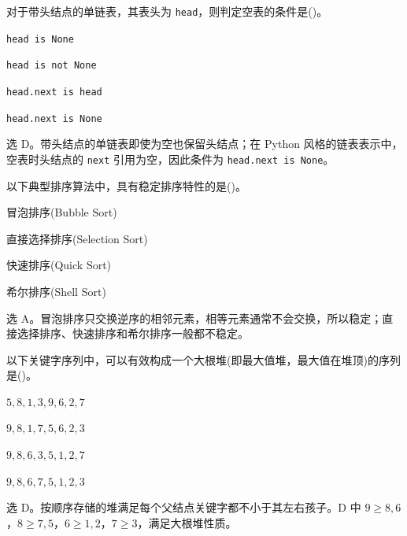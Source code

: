 \begin{question}
对于带头结点的单链表，其表头为 \texttt{head}，则判定空表的条件是(\quad)。
\begin{choiceoptions}[2]
  \item \texttt{head is None}
  \item \texttt{head is not None}
  \item \texttt{head.next is head}
  \item \texttt{head.next is None}
\end{choiceoptions}
\begin{solution}
选 D。带头结点的单链表即使为空也保留头结点；在 Python 风格的链表表示中，空表时头结点的 \texttt{next} 引用为空，因此条件为 \texttt{head.next is None}。
\end{solution}
\end{question}

\begin{question}
以下典型排序算法中，具有稳定排序特性的是(\quad)。
\begin{choiceoptions}[1]
  \item 冒泡排序(Bubble Sort)
  \item 直接选择排序(Selection Sort)
  \item 快速排序(Quick Sort)
  \item 希尔排序(Shell Sort)
\end{choiceoptions}
\begin{solution}
选 A。冒泡排序只交换逆序的相邻元素，相等元素通常不会交换，所以稳定；直接选择排序、快速排序和希尔排序一般都不稳定。
\end{solution}
\end{question}

\begin{question}
以下关键字序列中，可以有效构成一个大根堆(即最大值堆，最大值在堆顶)的序列是(\quad)。
\begin{choiceoptions}[1]
  \item $5,8,1,3,9,6,2,7$
  \item $9,8,1,7,5,6,2,3$
  \item $9,8,6,3,5,1,2,7$
  \item $9,8,6,7,5,1,2,3$
\end{choiceoptions}
\begin{solution}
选 D。按顺序存储的堆满足每个父结点关键字都不小于其左右孩子。D 中 $9\ge 8,6$，$8\ge 7,5$，$6\ge 1,2$，$7\ge 3$，满足大根堆性质。
\end{solution}
\end{question}

